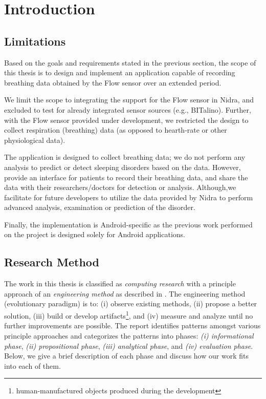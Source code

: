 \chapter{Introduction}\label{introduction}




\section{Limitations}
Based on the goals and requirements stated in the previous section, the scope of this thesis is to design and implement an application capable of recording breathing data obtained by the Flow sensor over an extended period. 

We limit the scope to integrating the support for the Flow sensor in Nidra, and excluded to test for already integrated sensor sources (e.g., BITalino). Further, with the Flow sensor provided under development, we restricted the design to collect respiration (breathing) data (as opposed to hearth-rate or other physiological data).

The application is designed to collect breathing data; we do not perform any analysis to predict or detect sleeping disorders based on the data. However, provide an interface for patients to record their breathing data, and share the data with their researchers/doctors for detection or analysis. Although,we facilitate for future developers to utilize the data provided by Nidra to perform advanced analysis, examination or prediction of the disorder. 

Finally, the implementation is Android-specific as the previous work performed on the project is designed solely for Android applications. 

\section{Research Method}
The work in this thesis is classified as \textit{computing research} with a principle approach of an \textit{engineering method} as described in \cite{Glass_1995}. The engineering method (evolutionary paradigm) is to: (i) observe existing methods, (ii) propose a better solution, (iii)  build or develop artifacts\footnote{human-manufactured objects produced during the development}, and (iv) measure and analyze until no further improvements are possible. The report identifies patterns amongst various principle approaches and categorizes the patterns into phases: \textit{(i) informational phase}, \textit{(ii) propositional phase}, \textit{(iii) analytical phase}, and \textit{(iv) evaluation phase}. Below, we give a brief description of each phase and discuss how our work fits into each of them. 

